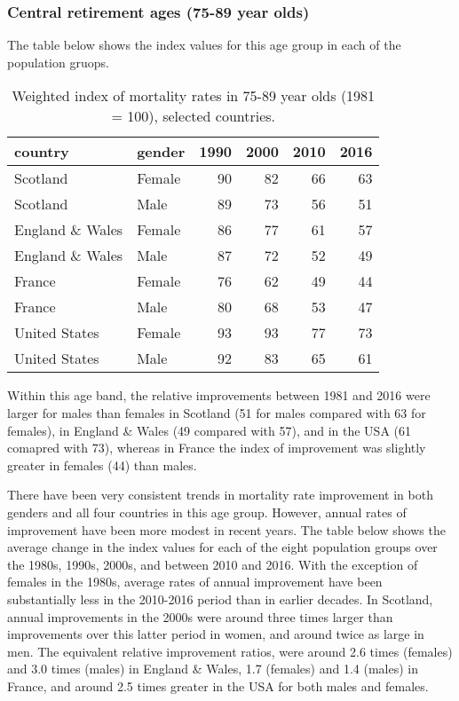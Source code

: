 \documentclass[]{article}
\begin{document}
\subsubsection{Central retirement ages (75-89 year
olds)}\label{central-retirement-ages-75-89-year-olds}

The table below shows the index values for this age group in each of the
population gruops.

\begin{table}

\caption{\label{tab:unnamed-chunk-9}Weighted index of mortality rates in 75-89 year olds (1981 = 100), selected countries.}
\centering
\begin{tabular}[t]{l|l|r|r|r|r}
\hline
country & gender & 1990 & 2000 & 2010 & 2016\\
\hline
Scotland & Female & 90 & 82 & 66 & 63\\
\hline
Scotland & Male & 89 & 73 & 56 & 51\\
\hline
England \& Wales & Female & 86 & 77 & 61 & 57\\
\hline
England \& Wales & Male & 87 & 72 & 52 & 49\\
\hline
France & Female & 76 & 62 & 49 & 44\\
\hline
France & Male & 80 & 68 & 53 & 47\\
\hline
United States & Female & 93 & 93 & 77 & 73\\
\hline
United States & Male & 92 & 83 & 65 & 61\\
\hline
\end{tabular}
\end{table}

Within this age band, the relative improvements between 1981 and 2016
were larger for males than females in Scotland (51 for males compared
with 63 for females), in England \& Wales (49 compared with 57), and in
the USA (61 comapred with 73), whereas in France the index of
improvement was slightly greater in females (44) than males.

There have been very consistent trends in mortality rate improvement in
both genders and all four countries in this age group. However, annual
rates of improvement have been more modest in recent years. The table
below shows the average change in the index values for each of the eight
population groups over the 1980s, 1990s, 2000s, and between 2010 and
2016. With the exception of females in the 1980s, average rates of
annual improvement have been substantially less in the 2010-2016 period
than in earlier decades. In Scotland, annual improvements in the 2000s
were around three times larger than improvements over this latter period
in women, and around twice as large in men. The equivalent relative
improvement ratios, were around 2.6 times (females) and 3.0 times
(males) in England \& Wales, 1.7 (females) and 1.4 (males) in France,
and around 2.5 times greater in the USA for both males and females.
\end{document}
